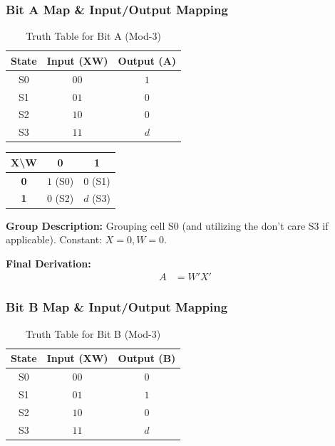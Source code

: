 \documentclass[journal,12pt,onecolumn]{IEEEtran}
\begin{document}
		\vspace{1em}
		\subsubsection{Bit A Map \& Input/Output Mapping}
		
		\begin{table}[H]
			\centering
			\begin{tabular}{|c|c|c|}
				\hline
				\textbf{State} & \textbf{Input (XW)} & \textbf{Output (A)} \\
				\hline
				S0 & $00$ & $1$ \\
				\hline
				S1 & $01$ & $0$ \\
				\hline
				S2 & $10$ & $0$ \\
				\hline
				S3 & $11$ & $d$ \\
				\hline
			\end{tabular}
			\caption{Truth Table for Bit A (Mod-3)}
		\end{table}
		
		\begin{table}[H]
			\centering
			\begin{tabular}{|c|c|c|}
				\hline
				\textbf{X\textbackslash W} & \textbf{0} & \textbf{1} \\
				\hline
				\textbf{0} & \cellcolor{grpRed}$1$ (S0) & $0$ (S1) \\
				\hline
				\textbf{1} & $0$ (S2) & \cellcolor{grpRed}$d$ (S3) \\
				\hline
			\end{tabular}
		\end{table}
		
		\begin{justify}
			\textbf{Group Description:} Grouping cell S0 (and utilizing the don't care S3 if applicable). Constant: $X=0, W=0$.
			
			\textbf{Final Derivation:}
			\begin{align}
				A &= W'X'
			\end{align}
		\end{justify}
		
		\vspace{1em}
		\subsubsection{Bit B Map \& Input/Output Mapping}
		
		\begin{table}[H]
			\centering
			\begin{tabular}{|c|c|c|}
				\hline
				\textbf{State} & \textbf{Input (XW)} & \textbf{Output (B)} \\
				\hline
				S0 & $00$ & $0$ \\
				\hline
				S1 & $01$ & $1$ \\
				\hline
				S2 & $10$ & $0$ \\
				\hline
				S3 & $11$ & $d$ \\
				\hline
			\end{tabular}
			\caption{Truth Table for Bit B (Mod-3)}
		\end{table}
		
\end{document}
